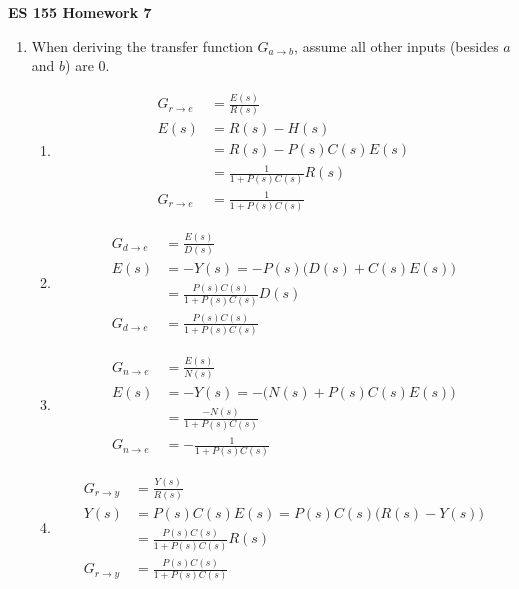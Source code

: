\documentclass[11pt]{article}
\theoremstyle{definition}
\begin{document}
\textbf{\huge{ES 155 Homework 7}}    %
\normalsize

\begin{enumerate}
    \item %
    When deriving the transfer function $G_{a\rightarrow b}$, assume all other inputs (besides $a$ and $b$) are 0.

    \begin{enumerate}
        \item        
        \begin{align*}
            G_{r \rightarrow e} &= \frac{E(s)}{R(s)} \\
            E(s) &= R(s) - H(s)\\ 
            &= R(s) - P(s)C(s)E(s) \\
            &= \frac{1}{1 + P(s)C(s)} R(s) \\
            G_{r \rightarrow e} &= \frac{1}{1 + P(s)C(s)}
        \end{align*}

        \item        
        \begin{align*}
            G_{d \rightarrow e} &= \frac{E(s)}{D(s)} \\
            E(s) &= -Y(s) = -P(s) \big( D(s) + C(s)E(s) \big) \\
            &= \frac{P(s)C(s)}{1 + P(s)C(s)} D(s) \\
            G_{d \rightarrow e} &= \frac{P(s)C(s)}{1 + P(s)C(s)}
        \end{align*}

        \item        
        \begin{align*}
            G_{n \rightarrow e} &= \frac{E(s)}{N(s)} \\
            E(s) &= -Y(s) = -\big( N(s) + P(s)C(s)E(s) \big) \\
            &= \frac{-N(s)}{1 + P(s)C(s)} \\
            G_{n \rightarrow e} &= - \frac{1}{1 + P(s)C(s)}
        \end{align*}        

        \item        
        \begin{align*}
            G_{r \rightarrow y} &= \frac{Y(s)}{R(s)} \\
            Y(s) &= P(s)C(s)E(s) = P(s)C(s) \big( R(s) - Y(s) \big) \\
            &= \frac{P(s)C(s)}{1 + P(s)C(s)}R(s) \\
            G_{r \rightarrow y} &= \frac{P(s)C(s)}{1 + P(s)C(s)}
        \end{align*}   


\end{enumerate}
\end{enumerate}
\end{document}

